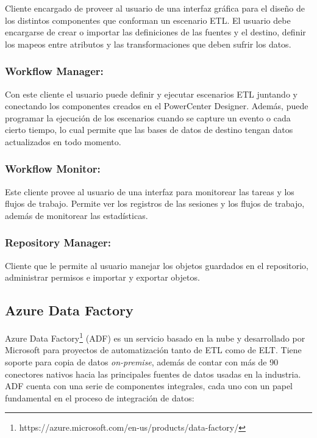 Cliente encargado de proveer al usuario de una interfaz gráfica para el diseño de los distintos componentes 
que conforman un escenario ETL. El usuario debe encargarse de crear o importar las definiciones de las fuentes y el 
destino, definir los mapeos entre atributos y las transformaciones que deben sufrir los datos.

\subsubsection{Workflow Manager:}

Con este cliente el usuario puede definir y ejecutar escenarios ETL juntando y conectando los componentes creados en el 
PowerCenter Designer. Adem\'as, puede programar la ejecución de los escenarios cuando se capture un evento o cada 
cierto tiempo, lo cual permite que las bases de datos de destino tengan datos actualizados en todo momento.

\subsubsection{Workflow Monitor:} 

Este cliente provee al usuario de una interfaz para monitorear las tareas y los flujos de trabajo. Permite ver 
los registros de las sesiones y los flujos de trabajo, además de monitorear las estadísticas.

\subsubsection{Repository Manager:}

Cliente que le permite al usuario manejar los objetos guardados en el repositorio, administrar permisos e 
importar y exportar objetos.




\subsection{Azure Data Factory}

Azure Data Factory\footnote{https://azure.microsoft.com/en-us/products/data-factory/} (ADF) es un servicio basado
en la nube y desarrollado por Microsoft para proyectos de 
automatización tanto de ETL como de ELT. Tiene soporte para copia de datos \emph{on-premise}, además de contar con  
m\'as de 90 conectores nativos hacia las principales fuentes de datos usadas en la industria\cite{azure_intro}. ADF cuenta con una 
serie de componentes integrales, cada uno con un papel fundamental en el proceso de integración de datos: 

